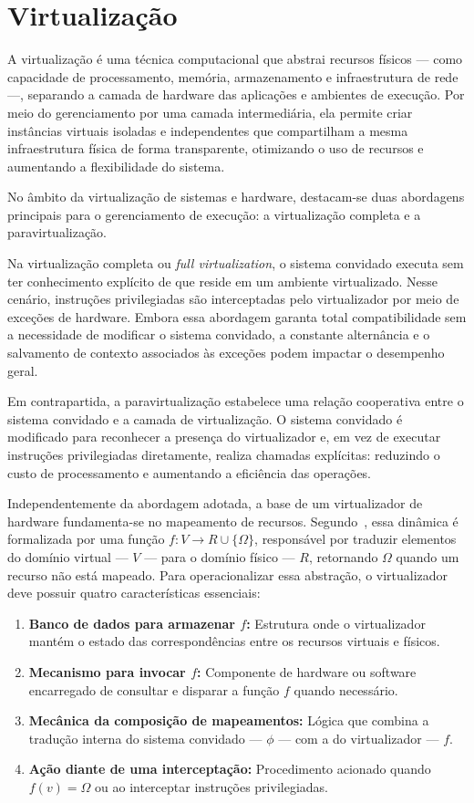 \section{Virtualização}

A virtualização é uma técnica computacional que abstrai recursos físicos — como capacidade de processamento, memória, armazenamento e infraestrutura de rede —,
separando a camada de hardware das aplicações e ambientes de execução. Por meio do gerenciamento por uma camada intermediária, ela permite criar instâncias virtuais isoladas
e independentes que compartilham a mesma infraestrutura física de forma transparente, otimizando o uso de recursos e aumentando a flexibilidade do sistema.

No âmbito da virtualização de sistemas e hardware, destacam-se duas abordagens principais para o gerenciamento de execução: a virtualização completa e a paravirtualização.

Na virtualização completa ou \textit{full virtualization}, o sistema convidado executa sem ter conhecimento explícito de que reside em um ambiente virtualizado.
Nesse cenário, instruções privilegiadas são interceptadas pelo virtualizador por meio de exceções de hardware. Embora essa abordagem garanta total compatibilidade sem a
necessidade de modificar o sistema convidado, a constante alternância e o salvamento de contexto associados às exceções podem impactar o desempenho geral.

Em contrapartida, a paravirtualização estabelece uma relação cooperativa entre o sistema convidado e a camada de virtualização. O sistema convidado é modificado para
reconhecer a presença do virtualizador e, em vez de executar instruções privilegiadas diretamente, realiza chamadas explícitas: reduzindo o custo de processamento e aumentando a
eficiência das operações.

Independentemente da abordagem adotada, a base de um virtualizador de hardware fundamenta-se no mapeamento de recursos. Segundo~\cite{architecture-of-virtual-machines},
essa dinâmica é formalizada por uma função $f: V \to R \cup \{\Omega\}$, responsável por traduzir elementos do domínio virtual --- $V$ --- para o domínio físico --- $R$, retornando $\Omega$
quando um recurso não está mapeado. Para operacionalizar essa abstração, o virtualizador deve possuir quatro características essenciais:

\begin{enumerate}
    \item \textbf{Banco de dados para armazenar $f$:} Estrutura onde o virtualizador mantém o estado das correspondências entre os recursos virtuais e físicos.
    \item \textbf{Mecanismo para invocar $f$:} Componente de hardware ou software encarregado de consultar e disparar a função $f$ quando necessário.
    \item \textbf{Mecânica da composição de mapeamentos:} Lógica que combina a tradução interna do sistema convidado --- $\phi$ --- com a do virtualizador --- $f$.
    \item \textbf{Ação diante de uma interceptação:} Procedimento acionado quando $f(v) = \Omega$ ou ao interceptar instruções privilegiadas.
\end{enumerate}

